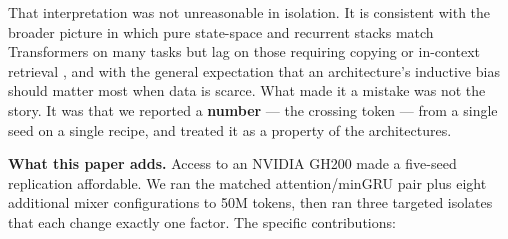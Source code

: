 That interpretation was not unreasonable in isolation. It is consistent with the broader picture
in which pure state-space and recurrent stacks match Transformers on many tasks but lag on those
requiring copying or in-context retrieval \cite{ref5}, and with the general expectation that an
architecture's inductive bias should matter most when data is scarce. What made it a mistake was
not the story. It was that we reported a \textbf{number} --- the crossing token --- from a single seed on a
single recipe, and treated it as a property of the architectures.

\textbf{What this paper adds.} Access to an NVIDIA GH200 made a five-seed replication affordable. We
ran the matched attention/minGRU pair plus eight additional mixer configurations to 50M tokens,
then ran three targeted isolates that each change exactly one factor. The specific contributions:

